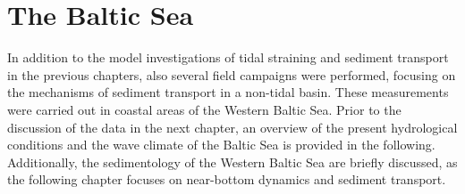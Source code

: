 \chapter{The Baltic Sea}
\label{kap-einleitung}

In addition to the model investigations of tidal straining and sediment 
transport in the previous chapters, also several field campaigns were 
performed, focusing on the mechanisms of sediment transport in a non-tidal 
basin. These measurements were carried out in 
coastal areas of the Western Baltic Sea. Prior to the 
discussion of the data in the next chapter, an overview of the present 
hydrological conditions and the wave climate of the Baltic Sea is provided in 
the following. Additionally, the sedimentology of the 
Western Baltic Sea are briefly discussed, as the following chapter focuses on 
near-bottom dynamics and sediment transport.

